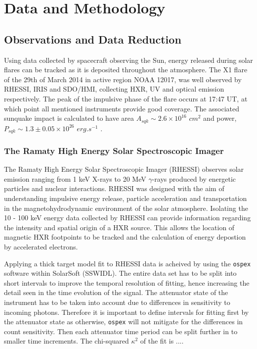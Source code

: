 \section{Data and Methodology}
\subsection{Observations and Data Reduction}
Using data collected by spacecraft observing the Sun, energy released during solar flares can be tracked as it is deposited throughout the atmosphere. The X1 flare of the 29th of March 2014 in active region NOAA 12017, was well observed by RHESSI, IRIS and SDO/HMI, collecting HXR, UV and optical emission respectively. The peak of the impulsive phase of the flare occurs at 17:47 UT, at which point all mentioned instruments provide good coverage. The associated sunquake impact is calculated to have area $A_{sqk} \sim 2.6{\times}10^{16}$ $cm^{2}$ and power, $P_{sqk} \sim 1.3\pm0.05{\times}10^{26}$ $erg.s^{-1}$ \citep{2014ApJ...796...85J}.

\subsubsection{The Ramaty High Energy Solar Spectroscopic Imager}\label{rhessi}
The Ramaty High Energy Solar Spectroscopic Imager (RHESSI) observes solar emission ranging from 1 keV X-rays to 20 MeV $\gamma$-rays produced by energetic particles and nuclear interactions. RHESSI was designed with the aim of understanding impulsive energy release, particle acceleration and transportation in the magnetohydrodynamic environment of the solar atmosphere. Isolating the 10 - 100 keV energy data collected by RHESSI can provide information regarding the intensity and spatial origin of a HXR source. This allows the location of magnetic HXR footpoints to be tracked and the calculation of energy depostion by accelerated electrons. 
  
Applying a thick target model fit to RHESSI data is acheived by using the \texttt{ospex} software within SolarSoft (SSWIDL). The entire data set has to be split into short intervals to improve the temporal resolution of fitting, hence increasing the detail seen in the time evolution of the signal. The attenuator state of the instrument has to be taken into account due to differences in sensitivity to incoming photons. Therefore it is important to define intervals for fitting first by the attenuator state as otherwise, \texttt{ospex} will not mitigate for the differences in count sensitivity. Then each attenuator time period can be split further in to smaller time increments. The chi-squared $\kappa^{2}$ of the fit is ....

